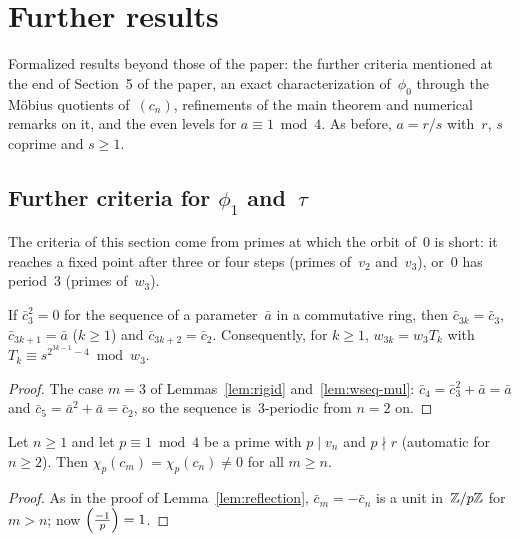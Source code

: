 \chapter{Further results}
\label{chap:further}

Formalized results beyond those of the paper: the further criteria mentioned at the end of
Section~5 of the paper, an exact characterization of~$\phi_0$ through the Möbius quotients
of~$(c_n)$, refinements of the main theorem and numerical remarks on it, and the even levels for
$a \equiv 1 \bmod 4$. As before, $a = r/s$ with~$r$, $s$ coprime and $s \ge 1$.

\section{Further criteria for \texorpdfstring{$\phi_1$ and~$\tau$}{phi\_1 and tau}}
\label{sec:further}

The criteria of this section come from primes at which the orbit of~$0$ is short: it reaches a
fixed point after three or four steps (primes of~$v_2$ and~$v_3$), or~$0$ has period~$3$ (primes
of~$w_3$).

\begin{lemma}
  \label{lem:strongcong3}
  \leanok
  If $\bar c_3^2 = 0$ for the sequence of a parameter~$\bar a$ in a commutative ring, then
  $\bar c_{3k} = \bar c_3$, $\bar c_{3k+1} = \bar a$ ($k \ge 1$) and $\bar c_{3k+2} = \bar c_2$.
  Consequently, for $k \ge 1$, $w_{3k} = w_3 T_k$ with $T_k \equiv s^{2^{3k-1} - 4} \bmod w_3$.
\end{lemma}
\begin{proof}
  \leanok
  The case $m = 3$ of Lemmas~\ref{lem:rigid} and~\ref{lem:wseq-mul}: $\bar c_4 = \bar c_3^2 +
  \bar a = \bar a$ and $\bar c_5 = \bar a^2 + \bar a = \bar c_2$, so the sequence is~$3$-periodic
  from $n = 2$ on.
\end{proof}

\begin{lemma}
  \label{lem:reflection-one}
  \leanok
  Let $n \ge 1$ and let $p \equiv 1 \bmod 4$ be a prime with $p \mid v_n$ and $p \nmid r$ (automatic
  for $n \ge 2$). Then $\chi_p(c_m) = \chi_p(c_n) \ne 0$ for all $m \ge n$.
\end{lemma}
\begin{proof}
  \leanok
  As in the proof of Lemma~\ref{lem:reflection}, $\bar c_m = -\bar c_n$ is a unit in~$\mathbb{Z}/p\mathbb{Z}$ for
  $m > n$; now $\left(\frac{-1}{p}\right) = 1$.
\end{proof}

